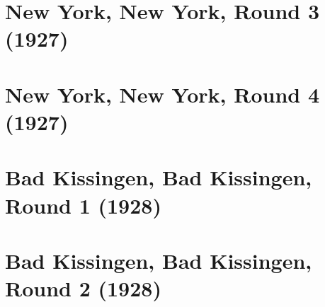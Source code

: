 \documentclass[11pt]{article}
\begin{document}
\clearpage



\clearpage



\clearpage



\clearpage



\clearpage

\section{New York, New York, Round 3 (1927)}


\clearpage



\clearpage



\clearpage



\clearpage



\clearpage

\section{New York, New York, Round 4 (1927)}


\clearpage



\clearpage



\clearpage



\clearpage



\clearpage

\section{Bad Kissingen, Bad Kissingen, Round 1 (1928)}


\clearpage

\section{Bad Kissingen, Bad Kissingen, Round 2 (1928)}

\end{document}
